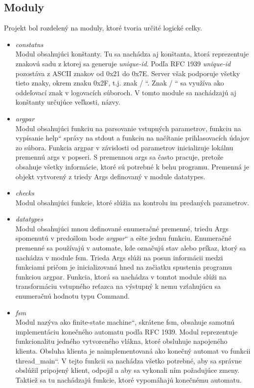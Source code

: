 \documentclass[11pt,a4paper]{article}
\providecommand{\uv}[1]{\quotedblbase #1\textquotedblleft}
\begin{document}
	\subsection{Moduly}
		
		\indent Projekt bol rozdelený na moduly, ktoré tvoria určité logické celky.

		\begin{itemize}

			\item \textit{constatns}\\[0.4em]
				\label{fig:uid}
				Modul obsahujúci konštanty. Tu sa nachádza aj konštanta, ktorá reprezentuje znakovú sadu z ktorej sa generuje \textit{unique-id}. Podľa RFC 1939 \textit{unique-id} pozostáva z ASCII znakov od 0x21 do 0x7E. Server však podporuje všetky tieto znaky, okrem znaku 0x2F, t.j. znak \uv{ / }. Znak \uv{ / } sa využíva ako oddeľovací znak v logovacích súboroch. V tomto module sa nachádzajú aj konštanty určujúce veľkosti, názvy.

			\item \textit{argpar}\\[0.4em]
				Modul obsahujúci funkciu na parsovanie vstupných parametrov, funkciu na vypísanie \uv{help} správy na stdout a funkciu na načítanie prihlasovacích údajov zo súbora. Funkcia argpar v závislosti od parametrov inicializuje lokálnu premennú args v popseri. S premennou args sa často pracuje, pretože obsahuje všetky informácie, ktoré sú potrebné k behu programu. Premenná je objekt vytvorený z triedy Args definovaný v module datatypes.

			\item \textit{checks}\\[0.4em]
				Modul obsahujúci funkcie, ktoré slúžia na kontrolu im predaných parametrov.

			\item \textit{datatypes}\\[0.4em]
				Modul obsahujúci mnou definované enumeračné premenné, triedu Args spomenutú v predošlom bode \uv{\textit{argpar}} a ešte jednu funkciu. Enumeračné premenné sa používajú v automate, kde označujú stav alebo príkaz, ktorý sa nachádza v module fsm. Trieda Args slúži na posun informácii medzi funkciami pričom je inicializovaná hned na začiatku spustenia programu funkciou argpar. Funkcia, ktorá sa nachádza v tomtot module slúži na transformáciu vstupného reťazca na výstupný k nemu vzťahujúcu sa enumeračnú hodnotu typu Command.

			\item \textit{fsm}\\[0.4em]
				Modul nazýva ako \uv{finite-state machine}, skrátene fsm, obsahuje samotnú implementáciu konečného automatu podľa RFC 1939. Modul reprezentuje funkcionalitu jedného vytvoreného vlákna, ktoré obsluhuje napojeného klienta. Obsluha klienta je naimplementovaná ako konečný automat vo funkcii \uv{thread\_main}. V tejto funkcii sa nachádza všetko potrebné, aby sa správne obslúžil pripojený klient, odpojil a aby sa vykonali ním požadujúce zmeny. Taktiež sa tu nachádzajú funkcie, ktoré vypomáhajú konečnému automatu.


\end{itemize}
\end{document}
